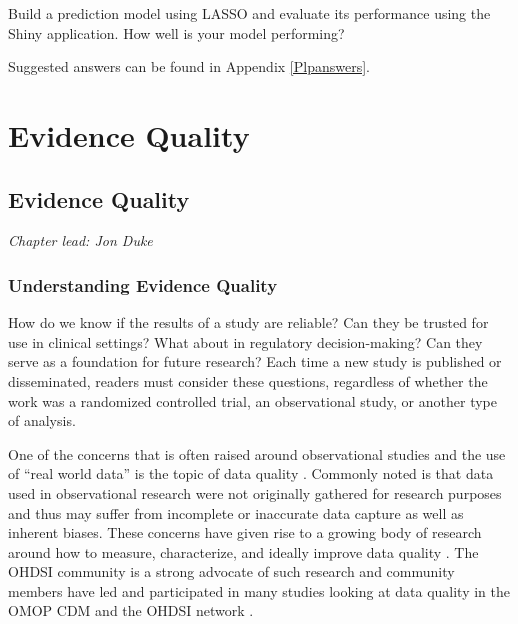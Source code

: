 \documentclass[11pt]{book}
\theoremstyle{definition}
\theoremstyle{definition}
\theoremstyle{definition}
\theoremstyle{remark}
\let\BeginKnitrBlock\begin \let\EndKnitrBlock\end
\begin{document}
\BeginKnitrBlock{exercise}
\protect\hypertarget{exr:exercisePlp3}{}{\label{exr:exercisePlp3} }Build a prediction model using LASSO and evaluate its performance using the Shiny application. How well is your model performing?
\EndKnitrBlock{exercise}

Suggested answers can be found in Appendix \ref{Plpanswers}.

\hypertarget{part-evidence-quality}{%
\part{Evidence Quality}\label{part-evidence-quality}}

\hypertarget{EvidenceQuality}{%
\chapter{Evidence Quality}\label{EvidenceQuality}}

\emph{Chapter lead: Jon Duke}

\hypertarget{understanding-evidence-quality}{%
\section{Understanding Evidence Quality}\label{understanding-evidence-quality}}

How do we know if the results of a study are reliable? Can they be trusted for use in clinical settings? What about in regulatory decision-making? Can they serve as a foundation for future research? Each time a new study is published or disseminated, readers must consider these questions, regardless of whether the work was a randomized controlled trial, an observational study, or another type of analysis.  

One of the concerns that is often raised around observational studies and the use of ``real world data'' is the topic of data quality \citep{botsis2010secondary, hersh2013caveats, sherman2016real}. Commonly noted is that data used in observational research were not originally gathered for research purposes and thus may suffer from incomplete or inaccurate data capture as well as inherent biases. These concerns have given rise to a growing body of research around how to measure, characterize, and ideally improve data quality \citep{kahn2012pragmatic, liaw2013towards, weiskopf2013methods}. The OHDSI community is a strong advocate of such research and community members have led and participated in many studies looking at data quality in the OMOP CDM and the OHDSI network \citep{huser_multisite_2016, kahn_transparent_2015, callahan2017comparison, yoon_2016}.  
\end{document}
